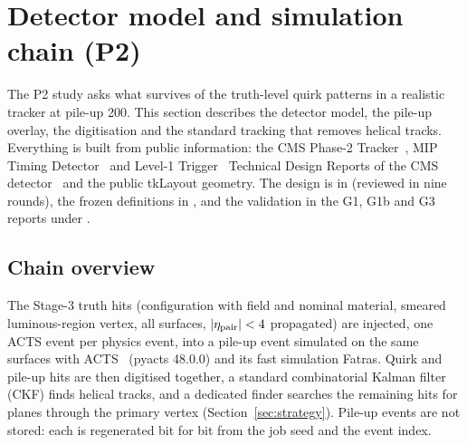 \section{Detector model and simulation chain (P2)}\label{sec:detector}

The P2 study asks what survives of the truth-level quirk patterns in a realistic tracker at pile-up 200. This section
describes the detector model, the pile-up overlay, the digitisation and the standard tracking that removes helical tracks.
Everything is built from public information: the CMS Phase-2 Tracker~\cite{CMS:2017lum}, MIP Timing
Detector~\cite{Butler:2019rpu} and Level-1 Trigger~\cite{Zabi:2020gjd} Technical Design Reports of the CMS
detector~\cite{CMS:2008xjf} and the public tkLayout
geometry. The design is in  (reviewed in nine rounds), the frozen definitions in
, and the validation in the G1, G1b and G3 reports under .

\subsection{Chain overview}\label{sec:detector:chain}
The Stage-3 truth hits (configuration with field and nominal material, smeared luminous-region vertex, all surfaces,
$|\eta_{\rm pair}|<4$ propagated) are injected, one ACTS event per physics event, into a pile-up event simulated on the
same surfaces with ACTS~\cite{Ai:2021ghi} (pyacts 48.0.0) and its fast simulation Fatras. Quirk and pile-up hits are then
digitised together, a standard combinatorial Kalman filter (CKF) finds helical tracks, and a dedicated finder searches
the remaining hits for planes through the primary vertex (Section~\ref{sec:strategy}). Pile-up events are not stored:
each is regenerated bit for bit from the job seed and the event index.

